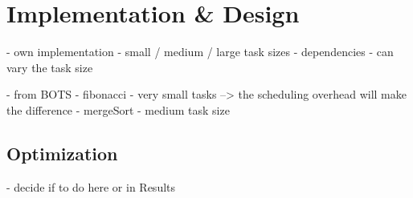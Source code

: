 \section{Implementation \& Design}
- own implementation
  - small / medium / large task sizes
  - dependencies
  - can vary the task size
  
- from BOTS
	- fibonacci
		- very small tasks --> the scheduling overhead will make the difference
	- mergeSort  
		- medium task size
		
		
\subsection{Optimization}
	- decide if to do here or in Results